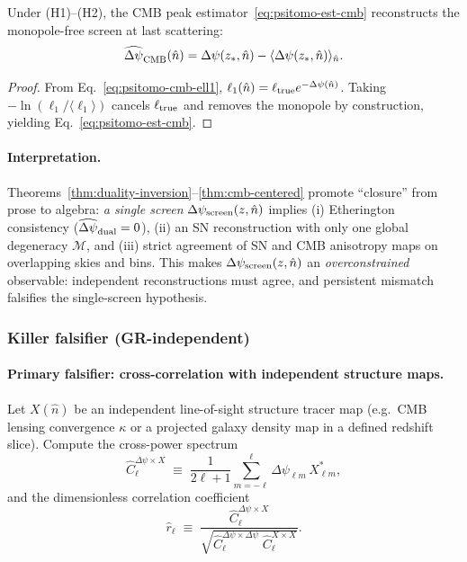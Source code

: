 \begin{theorem}\label{thm:cmb-centered}
Under (H1)--(H2), the CMB peak estimator~\eqref{eq:psitomo-est-cmb} reconstructs the monopole-free screen at last scattering:
\begin{equation}
\widehat{\Delta\psi}_{\rm CMB}(\hat n)=\Delta\psi(z_\ast,\hat n)-\langle\Delta\psi(z_\ast,\hat n)\rangle_{\hat n}.
\label{eq:closure-cmb}
\end{equation}
\end{theorem}

\begin{proof}
From Eq.~\eqref{eq:psitomo-cmb-ell1}, $\ell_1(\hat n)=\ell_{\rm true}e^{-\Delta\psi(\hat n)}$.
Taking $-\ln(\ell_1/\langle\ell_1\rangle)$ cancels $\ell_{\rm true}$ and removes the monopole by construction, yielding Eq.~\eqref{eq:psitomo-est-cmb}.
\end{proof}

\paragraph{Interpretation.}
Theorems~\ref{thm:duality-inversion}--\ref{thm:cmb-centered} promote ``closure'' from prose to algebra:
\emph{a single screen} $\Delta\psi_{\rm screen}(z,\hat n)$ implies (i) Etherington consistency ($\widehat{\Delta\psi}_{\rm dual}=0$), (ii) an SN reconstruction with only one global degeneracy $\mathcal{M}$, and (iii) strict agreement of SN and CMB anisotropy maps on overlapping skies and bins.
This makes $\Delta\psi_{\rm screen}(z,\hat n)$ an \emph{overconstrained} observable: independent reconstructions must agree, and persistent mismatch falsifies the single-screen hypothesis.

\subsubsection{Killer falsifier (GR-independent)}\label{sec:psitomo-falsifier}

\paragraph{Primary falsifier: cross-correlation with independent structure maps.}
Let $X(\hat n)$ be an independent line-of-sight structure tracer map (e.g.\ CMB lensing convergence $\kappa$ or a projected galaxy density map in a defined redshift slice).
Compute the cross-power spectrum
\begin{equation}
\widehat C_\ell^{\Delta\psi\times X}
\;\equiv\;
\frac{1}{2\ell+1}\sum_{m=-\ell}^{\ell}\Delta\psi_{\ell m}\,X_{\ell m}^\ast,
\label{eq:psitomo-cl-cross}
\end{equation}
and the dimensionless correlation coefficient
\begin{equation}
\widehat r_\ell
\;\equiv\;
\frac{\widehat C_\ell^{\Delta\psi\times X}}
{\sqrt{\widehat C_\ell^{\Delta\psi\times\Delta\psi}\;\widehat C_\ell^{X\times X}}}.
\label{eq:psitomo-r-ell}
\end{equation}

